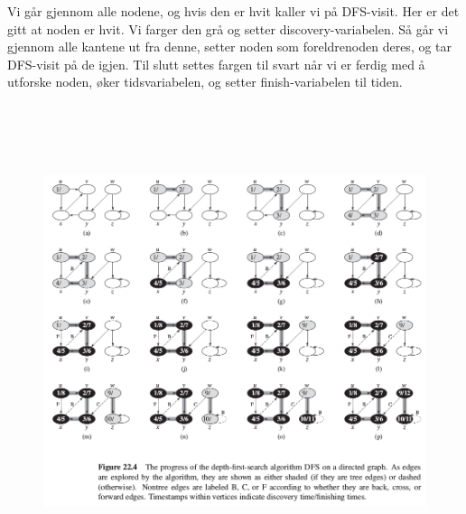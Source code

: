 \documentclass[12pt]{report}
\begin{document}

\par

Vi går gjennom alle nodene, og hvis den er hvit kaller vi på DFS-visit. Her er det gitt at noden er hvit. Vi farger den grå og setter discovery-variabelen. Så går vi gjennom alle kantene ut fra denne, setter noden som foreldrenoden deres, og tar DFS-visit på de igjen. Til slutt settes fargen til svart når vi er ferdig med å utforske noden, øker tidsvariabelen, og setter finish-variabelen til tiden. \par


\vspace{\baselineskip}



\begin{figure}[H]
	\begin{Center}
		\includegraphics[width=6.27in,height=5.46in]{./media/image101.png}
	\end{Center}
\end{figure}


\end{document}
